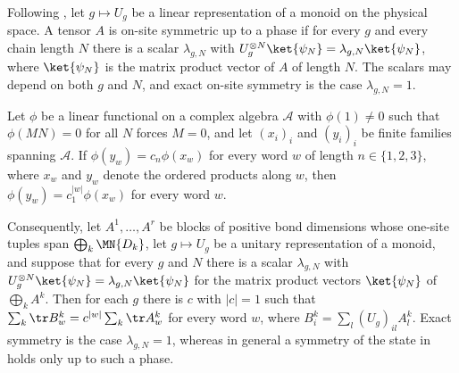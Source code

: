 \begin{definition}
    \label{def:on_site_symmetric_up_to_phase}
    \leanok
    Following \cite[lines~655--657, 2590--2593]{Schuch2011Phases}, let
    $g\mapsto U_g$ be a linear representation of a monoid on the physical
    space. A tensor $A$ is on-site symmetric up to a phase if for every $g$
    and every chain length $N$ there is a scalar $\lambda_{g,N}$ with
    $U_g^{\otimes N}\ket{\psi_N}=\lambda_{g,N}\ket{\psi_N}$, where
    $\ket{\psi_N}$ is the matrix product vector of $A$ of length $N$. The
    scalars may depend on both $g$ and $N$, and exact on-site symmetry is the
    case $\lambda_{g,N}=1$.
\end{definition}

\begin{lemma}
    \label{lem:block_symmetry_phase_power}
    \leanok
    Let $\phi$ be a linear functional on a complex algebra $\mathcal A$ with
    $\phi(1)\neq0$ such that $\phi(MN)=0$ for all $N$ forces $M=0$, and let
    $(x_i)_i$ and $(y_i)_i$ be finite families spanning $\mathcal A$. If
    $\phi(y_w)=c_n\phi(x_w)$ for every word $w$ of length $n\in\{1,2,3\}$,
    where $x_w$ and $y_w$ denote the ordered products along $w$, then
    $\phi(y_w)=c_1^{|w|}\phi(x_w)$ for every word $w$.

    Consequently, let $A^1,\dots,A^r$ be blocks of positive bond dimensions
    whose one-site tuples span $\bigoplus_k\MN{D_k}$, let $g\mapsto U_g$ be a
    unitary representation of a monoid, and suppose that for every $g$ and
    $N$ there is a scalar $\lambda_{g,N}$ with
    $U_g^{\otimes N}\ket{\psi_N}=\lambda_{g,N}\ket{\psi_N}$ for the matrix
    product vectors $\ket{\psi_N}$ of $\bigoplus_kA^k$. Then for each $g$
    there is $c$ with $|c|=1$ such that
    $\sum_k\tr B^k_w=c^{|w|}\sum_k\tr A^k_w$ for every word $w$, where
    $B^k_i=\sum_l(U_g)_{il}A^k_l$. Exact symmetry is the case
    $\lambda_{g,N}=1$, whereas in general a symmetry of the state in
    \cite[lines~1313--1314, 2590--2593]{Schuch2011Phases} holds only up to
    such a phase.
\end{lemma}

